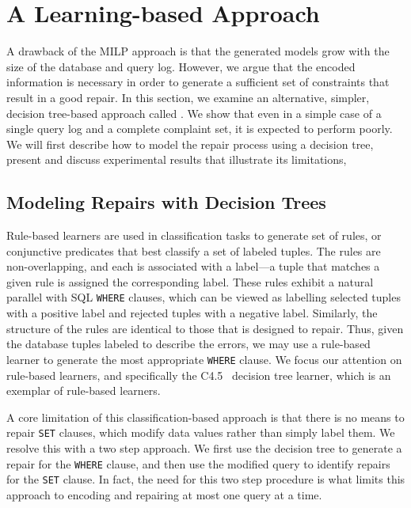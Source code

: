 
\appendix

\section{A Learning-based Approach}
\label{sec:heuristic}
  
A drawback of the MILP approach is that the generated models grow with the 
size of the database and query log.
However, we argue that the encoded information is necessary in order to generate a sufficient set of constraints that result in a good repair.
In this section, we examine an alternative, simpler, decision tree-based approach called \dt. 
We show that even in a simple case of a single query log and a complete complaint set, it is expected to perform poorly.
We will first describe how to model the repair process using a decision tree,
present and discuss experimental results that illustrate its limitations, 

\subsection{Modeling Repairs with Decision Trees}


Rule-based learners are used in classification tasks to generate set of rules, or conjunctive predicates that best classify a set of labeled tuples.
The rules are non-overlapping, and each is associated with a label---a tuple that matches a given rule is assigned the corresponding label.
These rules exhibit a natural parallel with SQL \texttt{WHERE} clauses, 
which can be viewed as labelling selected tuples with a positive label and rejected tuples with a negative label.
Similarly, the structure of the rules are identical to those that \sys is designed to repair.
Thus, given the database tuples labeled to describe the errors, we may use a rule-based learner to
generate the most appropriate \texttt{WHERE} clause.
We focus our attention on rule-based learners,
and specifically the C4.5~\cite{quinlan1987} decision tree learner, which is an 
exemplar of rule-based learners.

A core limitation of this classification-based approach is that there is no means to 
repair \texttt{SET} clauses, which modify data values rather than simply label them.
We resolve this with a two step approach.
We first use the decision tree to generate a repair for the
\texttt{WHERE} clause, and then use the modified query to identify repairs for the \texttt{SET} clause.
In fact, the need for this two step procedure is what limits this approach to encoding and repairing at most one query
at a time.

